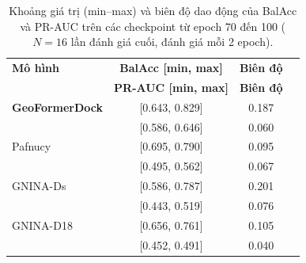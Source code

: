 \begin{table}[!t]
\centering
\caption{Khoảng giá trị (min–max) và biên độ dao động của BalAcc và PR-AUC trên các checkpoint từ epoch 70 đến 100 ($N=16$ lần đánh giá cuối, đánh giá mỗi 2 epoch).}
\label{tab:checkpoint_stability}
\footnotesize
\begin{tabular}{l ccc}
\hline
\textbf{Mô hình} & \textbf{BalAcc [min, max]} & \textbf{Biên độ} \\
 & \textbf{PR-AUC [min, max]} & \textbf{Biên độ} \\
\hline
\textbf{GeoFormerDock} & [0.643, 0.829] & 0.187 \\
 & [0.586, 0.646] & 0.060 \\
Pafnucy & [0.695, 0.790] & 0.095 \\
 & [0.495, 0.562] & 0.067 \\
GNINA-Ds & [0.586, 0.787] & 0.201 \\
 & [0.443, 0.519] & 0.076 \\
GNINA-D18 & [0.656, 0.761] & 0.105 \\
 & [0.452, 0.491] & 0.040 \\
\hline
\end{tabular}
\end{table}
